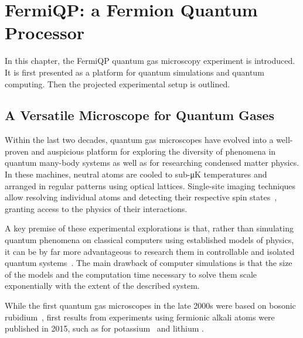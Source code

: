 \renewcommand{\imagepath}{../20-fermiqp/img}

\chapter{FermiQP: a Fermion Quantum Processor}
In this chapter, the FermiQP quantum gas microscopy experiment is introduced. It is first presented as a platform for quantum simulations and quantum computing. Then the projected experimental setup is outlined.

\section{A Versatile Microscope for Quantum Gases}\label{ch:quantum_gas_microscopy}
Within the last two decades, quantum gas microscopes have evolved into a well-proven and auspicious platform for exploring the diversity of phenomena in quantum many-body systems as well as for researching condensed matter physics. In these machines, neutral atoms are cooled to sub-\si[]{\micro\kelvin} temperatures and arranged in regular patterns using optical lattices. Single-site imaging techniques allow resolving individual atoms and detecting their respective spin states~\cite{bloch_many-body_2008,gross_quantum_2017, gross_quantum_2021}, granting access to the physics of their interactions.

A key premise of these experimental explorations is that, rather than simulating quantum phenomena on classical computers using established models of physics, it can be by far more advantageous to research them in controllable and isolated quantum systems~\cite{feynman_simulating_1982}. The main drawback of computer simulations is that the size of the models and the computation time necessary to solve them scale exponentially with the extent of the described system.

While the first quantum gas microscopes in the late 2000s were based on bosonic rubidium~\cite{bakr_quantum_2009, sherson_single-atom-resolved_2010}, first results from experiments using fermionic alkali atoms were published in 2015, such as for potassium~\cite{cheuk_quantum-gas_2015, haller_single-atom_2015} and lithium \cite{parsons_site-resolved_2015, omran_microscopic_2015}.


